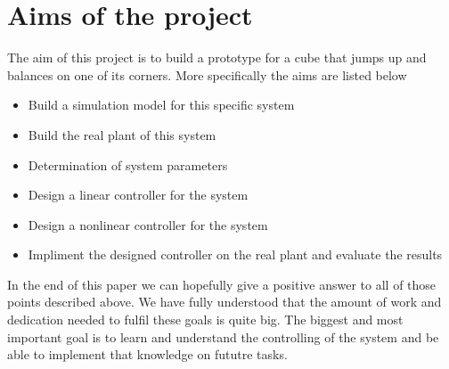 \section{Aims of the project}
The aim of this project is to build a prototype for a cube that jumps up and balances on one of its corners.
More specifically the aims are listed below

\begin{itemize}
 \item Build a simulation model for this specific system
 \item Build the real plant of this system
 \item Determination of system parameters
 \item Design a linear controller for the system
 \item Design a nonlinear controller for the system
 \item Impliment the designed controller on the real plant and evaluate the results
\end{itemize}
In the end of this paper we can hopefully give a positive answer to all of those points described above.
We have fully understood that the amount of work and dedication needed to fulfil these goals is quite big.
The biggest and most important goal is to learn and understand the controlling of the system and be able to implement that knowledge on fututre tasks.


